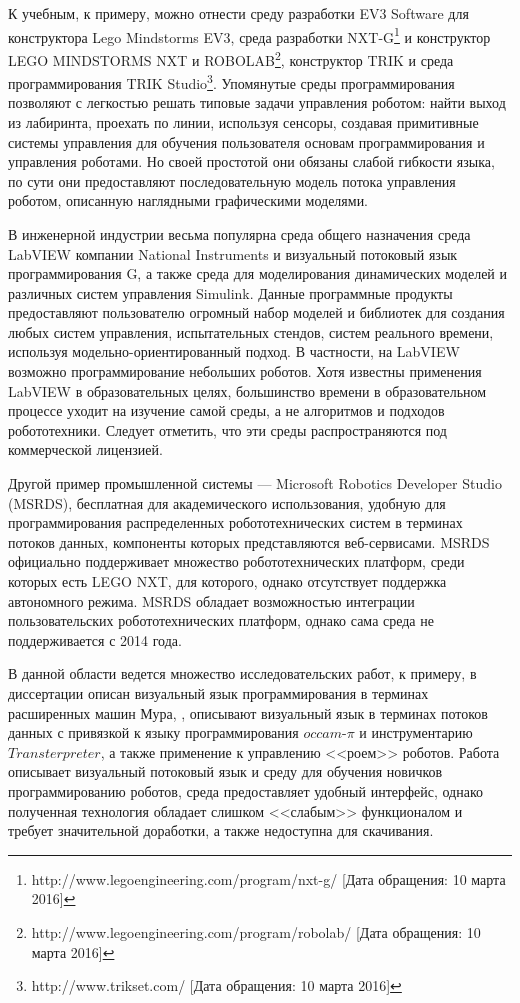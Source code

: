\documentclass[conference]{IEEEtran}
\begin{document}
К учебным, к примеру, можно отнести среду разработки EV3 Software\cite{3_rollins} для конструктора Lego Mindstorms EV3, среда разработки NXT-G\footnote{http://www.legoengineering.com/program/nxt-g/ [Дата обращения: 10 марта 2016]} и конструктор LEGO MINDSTORMS NXT и ROBOLAB\footnote{http://www.legoengineering.com/program/robolab/ [Дата обращения: 10 марта 2016]}, конструктор TRIK и среда программирования TRIK Studio\footnote{http://www.trikset.com/ [Дата обращения: 10 марта 2016]}. Упомянутые среды программирования позволяют с легкостью решать типовые задачи управления роботом: найти выход из лабиринта, проехать по линии, используя сенсоры, создавая примитивные системы управления для обучения пользователя основам программирования и управления роботами. Но своей простотой они обязаны слабой гибкости языка, по сути они предоставляют последовательную модель потока управления роботом, описанную наглядными графическими моделями.

В инженерной индустрии весьма популярна среда общего назначения среда LabVIEW компании National Instruments и визуальный потоковый язык программирования G, а также среда для моделирования динамических моделей и различных систем управления Simulink. Данные программные продукты предоставляют пользователю огромный набор моделей и библиотек для создания любых систем управления, испытательных стендов, систем реального времени, используя модельно-ориентированный подход. В частности, на LabVIEW возможно программирование небольших роботов. Хотя известны применения LabVIEW в образовательных целях\cite{1_gomez-de-gabriel_mandow_fernandez-lozano_garcia-cerezo_2011}, большинство времени в образовательном процессе уходит на изучение самой среды, а не алгоритмов и подходов робототехники. Следует отметить, что эти среды распространяются под коммерческой лицензией.

Другой пример промышленной системы --- Microsoft Robotics Developer Studio (MSRDS)\cite{jackson2007microsoft}, бесплатная для академического использования, удобную для программирования распределенных робототехнических систем в терминах потоков данных, компоненты которых представляются веб-сервисами. MSRDS официально поддерживает множество робототехнических платформ, среди которых есть LEGO NXT\cite{kim2007programming}, для которого, однако отсутствует поддержка автономного режима. MSRDS обладает возможностью интеграции пользовательских робототехнических платформ, однако сама среда не поддерживается с 2014 года.
 
В данной области ведется множество исследовательских работ, к примеру, в диссертации\cite{banyasad2000visual} описан визуальный язык программирования в терминах расширенных машин Мура, \cite{simpson2008visual},\cite{posso2011process} описывают визуальный язык в терминах потоков данных с привязкой к языку программирования $occam\mbox{-}\pi$ и инструментарию $Transterpreter$, а также применение к управлению <<роем>> роботов. Работа\cite{diprose2011ruru} описывает визуальный потоковый язык и среду для обучения новичков программированию роботов, среда предоставляет удобный интерфейс, однако полученная технология обладает слишком <<слабым>> функционалом и требует значительной доработки, а также недоступна для скачивания.
\end{document}
